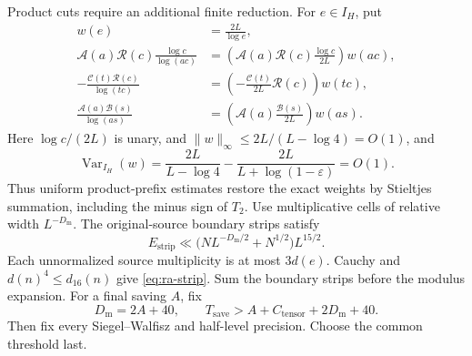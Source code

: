 Product cuts require an additional finite reduction. For \(e\in I_H\), put
\begin{equation}\label{eq:ra-restoration}
\begin{aligned}
 w(e)&=\frac{2L}{\log e},\\
 \mathcal A(a)\mathcal R(c)\frac{\log c}{\log(ac)}
 &=\left(\mathcal A(a)\mathcal R(c)\frac{\log c}{2L}\right)w(ac),\\
 -\frac{\mathcal C(t)\mathcal R(c)}{\log(tc)}
 &=\left(-\frac{\mathcal C(t)}{2L}\mathcal R(c)\right)w(tc),\\
 \frac{\mathcal A(a)\mathcal B(s)}{\log(as)}
 &=\left(\mathcal A(a)\frac{\mathcal B(s)}{2L}\right)w(as).
\end{aligned}
\end{equation}
Here \(\log c/(2L)\) is unary, and
\(\|w\|_\infty\le2L/(L-\log4)=O(1)\), and
\[
 \operatorname{Var}_{I_H}(w)
 =\frac{2L}{L-\log4}-\frac{2L}{L+\log(1-\varepsilon)}=O(1).
\]
Thus uniform product-prefix estimates restore the exact weights by
Stieltjes summation, including the minus sign of \(T_2\).
Use multiplicative cells of relative width \(L^{-D_{\mathrm m}}\).
The original-source boundary strips satisfy
\begin{equation}\label{eq:ra-strip}
 E_{\mathrm{strip}}\ll
       \bigl(NL^{-D_{\mathrm m}/2}+N^{1/2}\bigr)L^{15/2}.
\end{equation}
Each unnormalized source multiplicity is at most \(3d(e)\).
Cauchy and \(d(n)^4\le d_{16}(n)\) give \eqref{eq:ra-strip}.
Sum the boundary strips before the modulus expansion.
For a final saving \(A\), fix
\begin{equation}\label{eq:ra-precision-order}
 D_{\mathrm m}=2A+40,\qquad
 T_{\mathrm{save}}>A+C_{\mathrm{tensor}}+2D_{\mathrm m}+40.
\end{equation}
Then fix every Siegel--Walfisz and half-level precision.
Choose the common threshold last.

